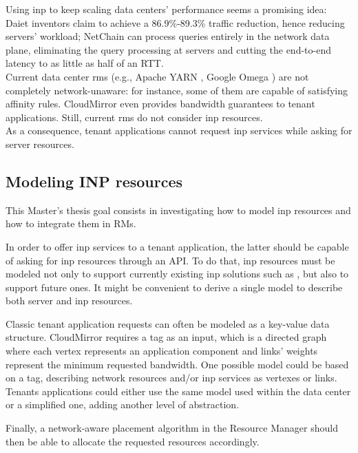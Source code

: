 Using \gls{inp} to keep scaling data centers' performance seems a promising idea: Daiet \cite{daiet} inventors claim to achieve a 86.9\%-89.3\% traffic reduction, hence reducing servers' workload; NetChain \cite{netchain} can process queries entirely in the network data plane, eliminating the query processing at servers and cutting the end-to-end latency to as little as half of an RTT.\\
Current data center \glspl{rm} (e.g., Apache YARN \cite{yarn}, Google Omega \cite{omega}) are not completely network-unaware: for instance, some of them are capable of satisfying affinity rules. CloudMirror \cite{cloudmirror} even provides bandwidth guarantees to tenant applications. Still, current \glspl{rm} do not consider \gls{inp} resources.\\
As a consequence, tenant applications cannot request \gls{inp} services while asking for server resources.

\subsection{Modeling INP resources}
This Master's thesis goal consists in investigating how to model \gls{inp} resources and how to integrate them in RMs.\par
In order to offer \gls{inp} services to a tenant application, the latter should be capable of asking for \gls{inp} resources through an API. To do that, \gls{inp} resources must be modeled not only to support currently existing \gls{inp} solutions such as \cite{daiet} \cite{netchain} \cite{incbricks} \cite{sharp}, but also to support future ones. It might be convenient to derive a single model to describe both server and \gls{inp} resources.\par
Classic tenant application requests can often be modeled as a key-value data structure. CloudMirror \cite{cloudmirror} requires a \gls{tag} as an input, which is a directed graph where each vertex represents an application component and links' weights represent the minimum requested bandwidth. One possible model could be based on a \gls{tag}, describing network resources and/or \gls{inp} services as vertexes or links. Tenants applications could either use the same model used within the data center or a simplified one, adding another level of abstraction.\par
Finally, a network-aware placement algorithm in the Resource Manager should then be able to allocate the requested resources accordingly.